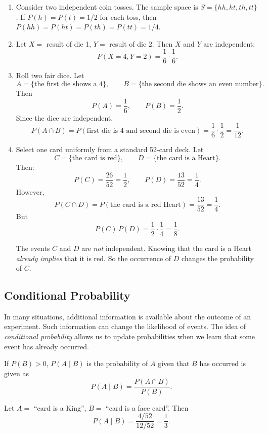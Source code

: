 \begin{example}
\begin{enumerate}
\item Consider two independent coin tosses. The sample space is  $S = \{hh,ht,th,tt\}$. If $P(h) = P(t) = 1/2$ for each toss, then $P(hh) = P(ht) = P(th) = P(tt) = 1/4$.
\item Let $X =$ result of die 1, $Y =$ result of die 2.
Then $X$ and $Y$ are independent:
\[
P(X=4, Y=2)=\frac{1}{6}\cdot\frac{1}{6}.
\]
\item  Roll two fair dice. Let
\[
A = \{\text{the first die shows a } 4\}, \qquad
B = \{\text{the second die shows an even number}\}.
\]
Then
\[
P(A)=\frac{1}{6},\qquad P(B)=\frac{1}{2}.
\]
Since the dice are independent,
\[
P(A \cap B)=P(\text{first die is }4 \text{ and second die is even})
= \frac{1}{6}\cdot \frac{1}{2} = \frac{1}{12}.
\]

\item Select one card uniformly from a standard 52-card deck. Let
\[
C = \{\text{the card is red}\}, \qquad
D = \{\text{the card is a Heart}\}.
\]
Then:
\[
P(C)=\frac{26}{52}=\frac{1}{2},\qquad
P(D)=\frac{13}{52}=\frac{1}{4}.
\]
However,
\[
P(C \cap D)=P(\text{the card is a red Heart}) = \frac{13}{52}=\frac{1}{4}.
\]
But
\[
P(C)\,P(D)=\frac{1}{2}\cdot\frac{1}{4}=\frac{1}{8}.
\]

The events $C$ and $D$ are \emph{not} independent.  Knowing that the card is a Heart \emph{already implies} that it is red.
So the occurrence of $D$ changes the probability of $C$.
\end{enumerate}
\end{example}



\subsection{Conditional Probability}

In many situations, additional information is available about the outcome of
an experiment. Such information can change the likelihood of events. The idea
of \emph{conditional probability} allows us to update probabilities when we
learn that some event has already occurred.

If $P(B)>0$, $P(A\mid B)$ is the probability of $A$ given that $B$ has occurred is given as
\[
P(A\mid B)=\frac{P(A\cap B)}{P(B)}.
\]


\begin{example}
Let $A=$ “card is a King”, $B=$ “card is a face card”.
Then
\[
P(A\mid B) = \frac{4/52}{12/52} = \frac{1}{3}.
\]
\end{example}

